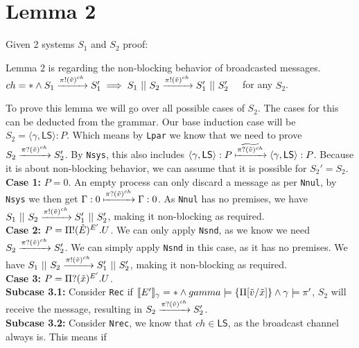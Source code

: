 \section{Lemma 2}
Given 2 systems $S_1$ and $S_2$ proof:\\
\begin{lemma}
Lemma 2 is regarding the non-blocking behavior of broadcasted messages.\\ 
$ch=* \land S_1 \xrightarrow[]{\pi !(\Tilde{v})^{ch}}S_1' \implies S_1\ ||\ S_2 \xrightarrow[]{\pi !(\Tilde{v})^{ch}}S_1'\ ||\ S_2'\quad $ for any $S_2$.\\
\end{lemma}

To prove this lemma we will go over all possible cases of $S_2$. The cases for this can be deducted from the grammar. Our base induction case will be $S_2=\langle \gamma, \mathsf{LS}\rangle : P$. Which means by \texttt{Lpar} we know that we need to prove $S_2 \xrightarrow[]{\pi ?(\Tilde{v})^{ch}}S_2'$. By \texttt{Nsys}, this also includes $\langle \gamma, \mathsf{LS}\rangle : P \xmapsto[]{\widetilde{\pi ?(\Tilde{v})^{ch}}}\langle \gamma, \mathsf{LS}\rangle : P$. Because it is about non-blocking behavior, we can assume that it is possible for $S_2'=S_2$.\\
\textbf{Case 1: } $P=0$. An empty process can only discard a message as per \texttt{Nnul}, by \texttt{Nsys} we then get $\Gamma : 0 \xmapsto[]{\pi ?(\Tilde{v})^{ch}} \Gamma : 0$. As \texttt{Nnul} has no premises, we have $S_1\ ||\ S_2 \xrightarrow[]{\pi !(\Tilde{v})^{ch}}S_1'\ ||\ S_2'$, making it non-blocking as required.\\
\textbf{Case 2: } $P=\Pi ! (\Tilde{E})^{E'}.U $. We can only apply \texttt{Nsnd}, as we know we need $S_2 \xrightarrow[]{\pi ?(\Tilde{v})^{ch}}S_2'$. We can simply apply \texttt{Nsnd} in this case, as it has no premises. We have $S_1\ ||\ S_2 \xrightarrow[]{\pi !(\Tilde{v})^{ch}}S_1'\ ||\ S_2'$, making it non-blocking as required. \\
\textbf{Case 3: } $P=\Pi ? (\Tilde{x})^{E'}.U $.\\
\indent \textbf{Subcase 3.1: } Consider \texttt{Rec} if $\llbracket E ' \rrbracket_\gamma = * \land gamma \models \{ \Pi [\Tilde{v}/\Tilde{x}] \} \land \gamma \models \pi ' $, $S_2$ will receive the message, resulting in $S_2 \xrightarrow[]{\pi ?(\Tilde{v})^{ch}}S_2'$. \\
\indent \textbf{Subcase 3.2: } Consider \texttt{Nrec}, we know that $ch\in \mathsf{LS}$, as the broadcast channel always is. This means if \\
